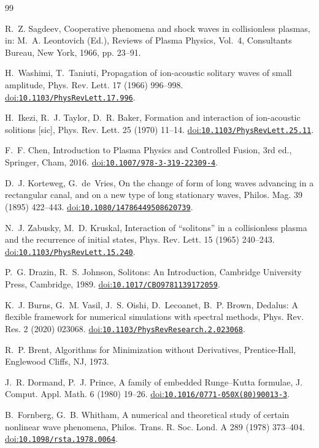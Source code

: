 \documentclass[preprint,12pt]{elsarticle}
\providecommand{\doi}[1]{\href{https://doi.org/#1}{doi:\nolinkurl{#1}}}
\begin{document}
\begin{thebibliography}{99}

R.~Z. Sagdeev, Cooperative phenomena and shock waves in collisionless plasmas,
in: M.~A. Leontovich (Ed.), Reviews of Plasma Physics, Vol.~4, Consultants
Bureau, New York, 1966, pp. 23--91.

H.~Washimi, T.~Taniuti, Propagation of ion-acoustic solitary waves of small
amplitude, Phys. Rev. Lett. 17 (1966) 996--998.
\doi{10.1103/PhysRevLett.17.996}.

H.~Ikezi, R.~J. Taylor, D.~R. Baker, Formation and interaction of ion-acoustic
solitions [sic], Phys. Rev. Lett. 25 (1970) 11--14.
\doi{10.1103/PhysRevLett.25.11}.

F.~F. Chen, Introduction to Plasma Physics and Controlled Fusion, 3rd ed.,
Springer, Cham, 2016. \doi{10.1007/978-3-319-22309-4}.

D.~J. Korteweg, G.~de~Vries, On the change of form of long waves advancing in a
rectangular canal, and on a new type of long stationary waves, Philos. Mag. 39
(1895) 422--443. \doi{10.1080/14786449508620739}.

N.~J. Zabusky, M.~D. Kruskal, Interaction of ``solitons'' in a collisionless
plasma and the recurrence of initial states, Phys. Rev. Lett. 15 (1965)
240--243. \doi{10.1103/PhysRevLett.15.240}.

P.~G. Drazin, R.~S. Johnson, Solitons: An Introduction, Cambridge University
Press, Cambridge, 1989. \doi{10.1017/CBO9781139172059}.

K.~J. Burns, G.~M. Vasil, J.~S. Oishi, D.~Lecoanet, B.~P. Brown, Dedalus: A
flexible framework for numerical simulations with spectral methods, Phys. Rev.
Res. 2 (2020) 023068. \doi{10.1103/PhysRevResearch.2.023068}.

R.~P. Brent, Algorithms for Minimization without Derivatives, Prentice-Hall,
Englewood Cliffs, NJ, 1973.

J.~R. Dormand, P.~J. Prince, A family of embedded Runge--Kutta formulae,
J. Comput. Appl. Math. 6 (1980) 19--26. \doi{10.1016/0771-050X(80)90013-3}.

B.~Fornberg, G.~B. Whitham, A numerical and theoretical study of certain
nonlinear wave phenomena, Philos. Trans. R. Soc. Lond. A 289 (1978) 373--404.
\doi{10.1098/rsta.1978.0064}.


\end{thebibliography}
\end{document}
